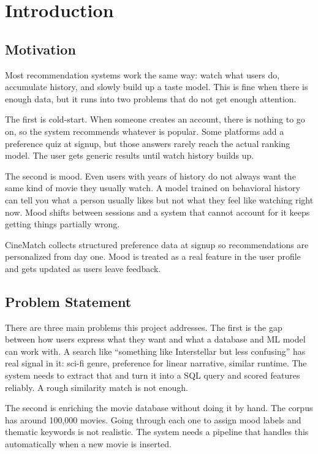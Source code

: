 \documentclass[conference]{IEEEtran}
\begin{document}
\section{Introduction}

\subsection{Motivation}

Most recommendation systems work the same way: watch what users do, accumulate history, and slowly build up a taste model. This is fine when there is enough data, but it runs into two problems that do not get enough attention.

The first is cold-start. When someone creates an account, there is nothing to go on, so the system recommends whatever is popular. Some platforms add a preference quiz at signup, but those answers rarely reach the actual ranking model. The user gets generic results until watch history builds up.

The second is mood. Even users with years of history do not always want the same kind of movie they usually watch. A model trained on behavioral history can tell you what a person usually likes but not what they feel like watching right now. Mood shifts between sessions and a system that cannot account for it keeps getting things partially wrong.

CineMatch collects structured preference data at signup so recommendations are personalized from day one. Mood is treated as a real feature in the user profile and gets updated as users leave feedback.

\subsection{Problem Statement}

There are three main problems this project addresses. The first is the gap between how users express what they want and what a database and ML model can work with. A search like ``something like Interstellar but less confusing'' has real signal in it: sci-fi genre, preference for linear narrative, similar runtime. The system needs to extract that and turn it into a SQL query and scored features reliably. A rough similarity match is not enough.

The second is enriching the movie database without doing it by hand. The corpus has around 100,000 movies. Going through each one to assign mood labels and thematic keywords is not realistic. The system needs a pipeline that handles this automatically when a new movie is inserted.
\end{document}

